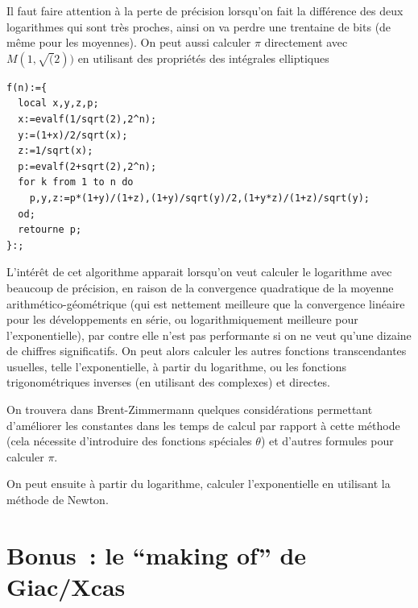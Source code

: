 \documentclass[a4paper,11pt]{article}
\begin{document}
\begin{giacjshere}
Il faut faire attention \`a la perte de pr\'ecision lorsqu'on fait
la diff\'erence des deux logarithmes qui sont tr\`es proches, ainsi
on va perdre une trentaine de bits (de m\^eme pour les moyennes).
On peut aussi calculer $\pi$ directement avec $M(1,\sqrt(2))$ en
utilisant des propri\'et\'es des int\'egrales elliptiques
\begin{verbatim}
f(n):={
  local x,y,z,p;
  x:=evalf(1/sqrt(2),2^n);
  y:=(1+x)/2/sqrt(x);
  z:=1/sqrt(x);
  p:=evalf(2+sqrt(2),2^n);
  for k from 1 to n do
    p,y,z:=p*(1+y)/(1+z),(1+y)/sqrt(y)/2,(1+y*z)/(1+z)/sqrt(y);
  od;
  retourne p;
}:;
\end{verbatim}

L'int\'er\^et de cet algorithme apparait lorsqu'on veut calculer
le logarithme avec beaucoup de pr\'ecision, en raison de la
convergence quadratique de la moyenne arithm\'etico-g\'eom\'etrique
(qui est nettement meilleure que la convergence lin\'eaire
pour les d\'eveloppements en s\'erie, ou logarithmiquement
meilleure pour l'exponentielle), par contre elle n'est pas
performante si on ne veut qu'une dizaine de chiffres significatifs. 
On peut alors calculer les autres
fonctions transcendantes usuelles, telle l'exponentielle,
\`a partir du logarithme, ou les fonctions trigonom\'etriques
inverses (en utilisant des complexes) et directes.

On trouvera dans Brent-Zimmermann quelques consid\'erations permettant
d'am\'eliorer les constantes dans les temps de calcul par rapport
\`a cette m\'ethode (cela n\'ecessite d'introduire des fonctions 
sp\'eciales $\theta$) et d'autres formules pour calculer $\pi$.

On peut ensuite \`a partir du logarithme, calculer l'exponentielle
en utilisant la m\'ethode de Newton.



\pagebreak

\appendix

\section{Bonus~: le ``making of'' de Giac/Xcas}


\end{giacjshere}
\end{document}

